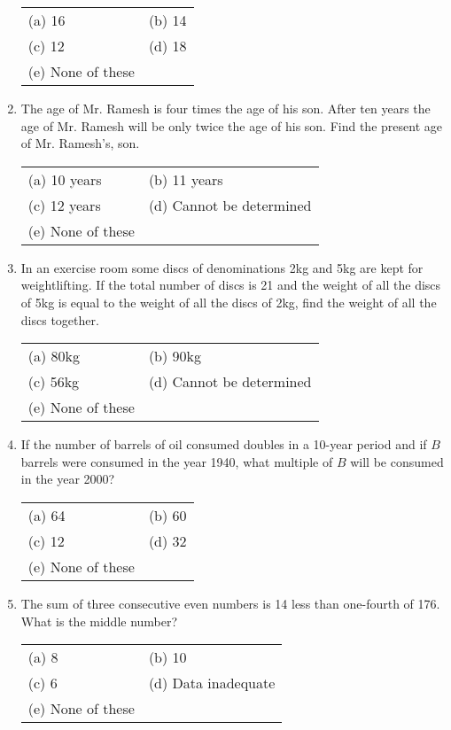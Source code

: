 \begin{multicols}{2}
\begin{enumerate}[leftmargin=*]
\begin{tabular}{l@{\qquad\quad}l}
(a) 16 & (b) 14 \\
(c) 12 & (d) 18 \\
(e) None of these
\end{tabular}

\item The age of Mr. Ramesh is four times the age of his son. After ten years the age of Mr. Ramesh will be only twice the age of his son. Find the present age of Mr. Ramesh's, son.

\begin{tabular}{l@{\qquad\quad}l}
(a) 10 years & (b) 11 years \\
(c) 12 years & (d) Cannot be determined \\
(e) None of these
\end{tabular}


\item In an exercise room some discs of denominations 2kg and 5kg are kept for weightlifting. If the total number of discs is 21 and the weight of all the discs of 5kg is equal to the weight of all the discs of 2kg, find the weight of all the discs together.

\begin{tabular}{l@{\qquad\quad}l}
(a) 80kg & (b) 90kg \\
(c) 56kg & (d) Cannot be determined \\
(e) None of these
\end{tabular}

\item If the number of barrels of oil consumed doubles in a 10-year period and if $B$ barrels were consumed in the year 1940, what multiple of $B$ will be consumed in the year 2000?

\begin{tabular}{l@{\qquad\quad}l}
(a) 64 & (b) 60 \\
(c) 12 & (d) 32 \\
(e) None of these
\end{tabular}


\item The sum of three consecutive even numbers is 14 less than one-fourth of 176. What is the middle number?

\begin{tabular}{l@{\qquad\quad}l}
(a) 8 & (b) 10 \\
(c) 6 & (d) Data inadequate \\
(e) None of these
\end{tabular}


\end{enumerate}
\end{multicols}
